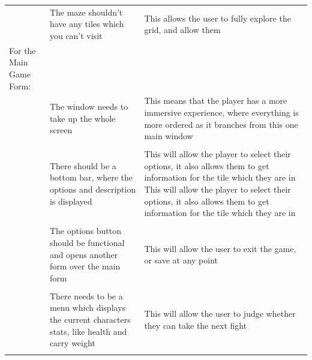 \documentclass[12pt]{article}
\begin{document}
\begin{tabularx}{\linewidth}{XXX}
                        & The maze shouldn't have any tiles which you can't visit                                            & This allows the user to fully explore the grid, and allow them                                                                                                                                                                                     \\
For the Main Game Form: &                                                                                                    &                                                                                                                                                                                                                                                    \\
                        & The window needs to take up the whole screen                                                       & This means that the player has a more immersive experience, where everything is more ordered as it branches from this one main window                                                                                                             \\ \\
                        & There should be a bottom bar, where the options and description is displayed                       & This will allow the player to select their options, it also allows them to get information for the tile which they are in This will allow the player to select their options, it also allows them to get information for the tile which they are in \\\\
                        & The options button should be functional and opens another form over the main form                & This will allow the user to exit the game, or save at any point                                                                                                                                                                                    \\\\
                        & There needs to be a menu which displays the current characters stats, like health and carry weight & This will allow the user to judge whether they can take the next fight                                                                                                                                                                             \\\\

\end{tabularx}
\end{document}
